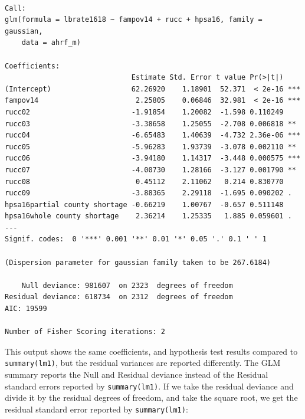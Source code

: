 \documentclass[
  letterpaper,
  DIV=11,
  numbers=noendperiod]{scrreprt}
\newenvironment{Shaded}{\begin{snugshade}}{\end{snugshade}}
\newcommand{\FunctionTok}[1]{\textcolor[rgb]{0.28,0.35,0.67}{#1}}
\newcommand{\NormalTok}[1]{\textcolor[rgb]{0.00,0.23,0.31}{#1}}
\newcommand{\SpecialCharTok}[1]{\textcolor[rgb]{0.37,0.37,0.37}{#1}}
\begin{document}
\begin{verbatim}

Call:
glm(formula = lbrate1618 ~ fampov14 + rucc + hpsa16, family = gaussian, 
    data = ahrf_m)

Coefficients:
                              Estimate Std. Error t value Pr(>|t|)    
(Intercept)                   62.26920    1.18901  52.371  < 2e-16 ***
fampov14                       2.25805    0.06846  32.981  < 2e-16 ***
rucc02                        -1.91854    1.20082  -1.598 0.110249    
rucc03                        -3.38658    1.25055  -2.708 0.006818 ** 
rucc04                        -6.65483    1.40639  -4.732 2.36e-06 ***
rucc05                        -5.96283    1.93739  -3.078 0.002110 ** 
rucc06                        -3.94180    1.14317  -3.448 0.000575 ***
rucc07                        -4.00730    1.28166  -3.127 0.001790 ** 
rucc08                         0.45112    2.11062   0.214 0.830770    
rucc09                        -3.88365    2.29118  -1.695 0.090202 .  
hpsa16partial county shortage -0.66219    1.00767  -0.657 0.511148    
hpsa16whole county shortage    2.36214    1.25335   1.885 0.059601 .  
---
Signif. codes:  0 '***' 0.001 '**' 0.01 '*' 0.05 '.' 0.1 ' ' 1

(Dispersion parameter for gaussian family taken to be 267.6184)

    Null deviance: 981607  on 2323  degrees of freedom
Residual deviance: 618734  on 2312  degrees of freedom
AIC: 19599

Number of Fisher Scoring iterations: 2
\end{verbatim}

This output shows the same coefficients, and hypothesis test results
compared to \texttt{summary(lm1)}, but the residual variances are
reported differently. The GLM summary reports the Null and Residual
deviance instead of the Residual standard errors reported by
\texttt{summary(lm1)}. If we take the residual deviance and divide it by
the residual degrees of freedom, and take the square root, we get the
residual standard error reported by \texttt{summary(lm1)}:

\begin{Shaded}
\end{Shaded}
\end{document}
